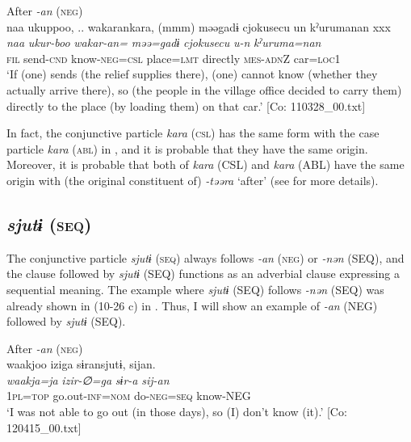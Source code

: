 \ex After \textit{{}-an} (\textsc{neg})\\
      \glll    naa  ukuppoo, ..  wakarankara,  (mmm)  məəgadɨ  {\textbar}cjokusecu{\textbar} un  kˀurumanan  xxx\\
    \textit{naa}  \textit{ukur-boo}  \textit{wakar-an=}    \textit{məə=gadɨ}  \textit{cjokusecu}    \textit{u-n}  \textit{kˀuruma=nan}  \\
    \textsc{fil}  send-\textsc{cnd}  know-\textsc{neg}=\textsc{csl}    place=\textsc{lmt}  directly   \textsc{mes}-\textsc{adn}Z  car=\textsc{loc}1  \\
\glt     ‘If (one) sends (the relief supplies there), (one) cannot know (whether they actually arrive there), so (the people in the village office decided to carry them) directly to the place (by loading them) on that car.’  [Co: 110328\_00.txt]
\z
\z

  In fact, the conjunctive particle \textit{kara} (\textsc{csl}) has the same form with the case particle \textit{kara} (\textsc{abl}) in , and it is probable that they have the same origin. Moreover, it is probable that both of \textit{kara} (CSL) and \textit{kara} (ABL) have the same origin with (the original constituent of) \textit{{}-təəra} ‘after’ (see  for more details).

\subsection{\textit{sjutɨ} (\textsc{seq})}\label{sec:10.2.4}

The conjunctive particle \textit{sjutɨ} (\textsc{seq}) always follows \textit{{}-an} (\textsc{neg}) or \textit{{}-nən} (SEQ), and the clause followed by \textit{sjutɨ} (SEQ) functions as an adverbial clause expressing a sequential meaning. The example where \textit{sjutɨ} (SEQ) follows \textit{{}-nən} (SEQ) was already shown in (10-26 c) in . Thus, I will show an example of \textit{{}-an} (NEG) followed by \textit{sjutɨ} (SEQ).

\ea\label{ex:10.35}   After \textit{{}-an} (\textsc{neg})\\
      \glll    waakjoo  iziga  sɨransjutɨ,  sijan.\\
    \textit{waakja=ja}  \textit{izir-∅=ga}  \textit{sɨr-a}  \textit{sij-an}\\
    1\textsc{pl}=\textsc{top}  go.out-\textsc{inf}=\textsc{nom}  do-\textsc{neg}=\textsc{seq}  know-NEG\\
\glt     ‘I was not able to go out (in those days), so (I) don’t know (it).’  [Co: 120415\_00.txt]
\z

